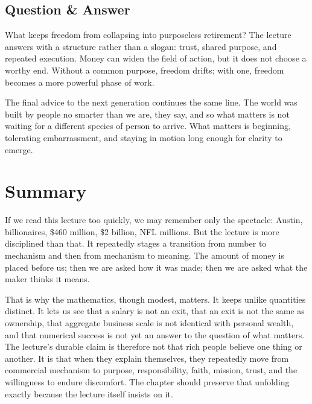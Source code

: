 \subsection{Question \& Answer}

What keeps freedom from collapsing into purposeless retirement? The lecture answers with a structure rather than a slogan: trust, shared purpose, and repeated execution. Money can widen the field of action, but it does not choose a worthy end. Without a common purpose, freedom drifts; with one, freedom becomes a more powerful phase of work.

The final advice to the next generation continues the same line. The world was built by people no smarter than we are, they say, and so what matters is not waiting for a different species of person to arrive. What matters is beginning, tolerating embarrassment, and staying in motion long enough for clarity to emerge.

\section{Summary}

If we read this lecture too quickly, we may remember only the spectacle: Austin, billionaires, \$460 million, \$2 billion, NFL millions. But the lecture is more disciplined than that. It repeatedly stages a transition from number to mechanism and then from mechanism to meaning. The amount of money is placed before us; then we are asked how it was made; then we are asked what the maker thinks it means.

That is why the mathematics, though modest, matters. It keeps unlike quantities distinct. It lets us see that a salary is not an exit, that an exit is not the same as ownership, that aggregate business scale is not identical with personal wealth, and that numerical success is not yet an answer to the question of what matters. The lecture's durable claim is therefore not that rich people believe one thing or another. It is that when they explain themselves, they repeatedly move from commercial mechanism to purpose, responsibility, faith, mission, trust, and the willingness to endure discomfort. The chapter should preserve that unfolding exactly because the lecture itself insists on it.